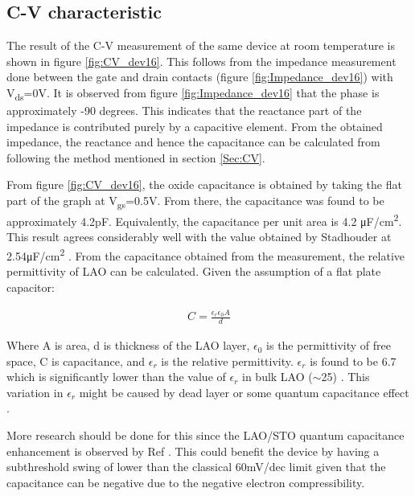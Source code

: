 \documentclass[11pt,a4paper]{report}
\begin{document}
\newpage


\subsection{C-V characteristic}
The result of the C-V measurement of the same device at room temperature is shown in figure \ref{fig:CV_dev16}. This follows from the impedance measurement done between the gate and drain contacts (figure \ref{fig:Impedance_dev16}) with V\textsubscript{ds}=0V. It is observed from figure \ref{fig:Impedance_dev16} that the phase is approximately -90 degrees. This indicates that the reactance part of the impedance is contributed purely by a capacitive element. From the obtained impedance, the reactance and hence the capacitance can be calculated from following the method mentioned in section \ref{Sec:CV}. 

From figure \ref{fig:CV_dev16}, the oxide capacitance is obtained by taking the flat part of the graph at V\textsubscript{gs}=0.5V. From there, the capacitance was found to be approximately 4.2\si{pF}. Equivalently, the capacitance per unit area is 4.2 \si{\micro F/cm^2}. This result agrees considerably well with the value obtained by Stadhouder at 2.54\si{\micro F/cm^2} \cite{stadhouder_2018}. From the capacitance obtained from the measurement, the relative permittivity of LAO can be calculated. Given the assumption of a flat plate capacitor:

\begin{align}
    C = \frac{\epsilon_r \epsilon_0 A}{d}
\end{align}

Where A is area, d is thickness of the LAO layer, $\epsilon_0$ is the permittivity of free space, C is capacitance, and $\epsilon_r$ is the relative permittivity. $\epsilon_r$ is found to be 6.7 which is significantly lower than the value of $\epsilon_r$ in bulk LAO ($\sim$25) \cite{ohtomo_hwang_2004}. This variation in $\epsilon_r$ might be caused by dead layer \cite{hosoda_hikita_hwang_bell_2013} or some quantum capacitance effect \cite{li_Large_capacitance_enhancement_2011}.

More research should be done for this since the LAO/STO quantum capacitance enhancement is observed by Ref \cite{li_Large_capacitance_enhancement_2011}. This could benefit the device by having a subthreshold swing of lower than the classical 60mV/dec limit given that the capacitance can be negative due to the negative electron compressibility.

\end{document}
